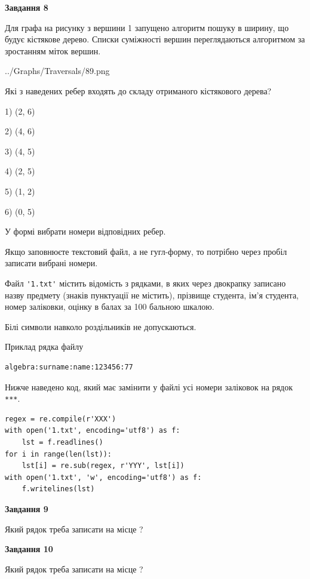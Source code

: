 \documentclass[12pt, ukrainian]{article}
\def\code#1{\Verb!#1!}
\begin{document}
{\begin {large}
{\begin {center}\textbf{Завдання 8}\end {center}}\par
Для графа на рисунку з вершини 1 запущено алгоритм пошуку в ширину, що будує кістякове дерево. Списки суміжності вершин переглядаються алгоритмом за зростанням міток вершин.\par
\begin{center}
	{../Graphs/Traversals/89.png}
\end{center}
\par Які з наведених ребер входять до складу отриманого кістякового дерева?\par
1) (2, 6)\par
2) (4, 6)\par
3) (4, 5)\par
4) (2, 5)\par
5) (1, 2)\par
6) (0, 5)\par
{\vskip 15pt} У формі вибрати номери відповідних ребер.


Якщо заповнюєте текстовий файл, а не гугл-форму, то потрібно через пробіл записа\-ти вибрані номери.\par
\newpage


Файл \code{'1.txt'} містить відомість з рядками, в яких через двокрапку записа\-но назву предмету (знаків пунктуації не містить), прізвище студента, ім'я студента, номер залі\-ков\-ки, оцінку в балах за 100 бальною шкалою.

Білі символи навколо роздільників не допускаються.

Приклад рядка файлу



\begin{verbatim}
algebra:surname:name:123456:77
\end{verbatim}


Нижче наведено код, який має замінити у файлі усі номери заліковок на рядок \code{***}.



\begin{verbatim}
regex = re.compile(r'XXX')
with open('1.txt', encoding='utf8') as f:
    lst = f.readlines()
for i in range(len(lst)):
    lst[i] = re.sub(regex, r'YYY', lst[i])
with open('1.txt', 'w', encoding='utf8') as f:
    f.writelines(lst)
\end{verbatim}




{\begin {center}\textbf{Завдання 9}\end {center}}\par
Який рядок треба записати на місце  ?\par
\vspace{5mm}


{\begin {center}\textbf{Завдання 10}\end {center}}\par
Який рядок треба записати на місце  ?\par


\newpage


\end {large}}
\end{document}
